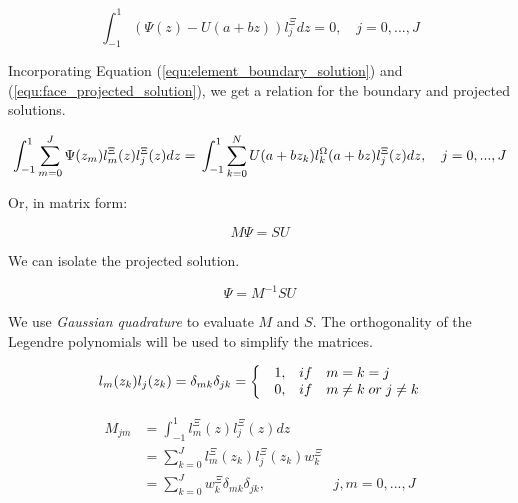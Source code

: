 \begin{equation} \label{equ:zero_error}
	\int_{-1}^{1} \left( \Psi (z) - U(a + bz) \right) l_j^\Xi dz = 0, \quad j = 0, ...,J
\end{equation}

Incorporating Equation (\ref{equ:element_boundary_solution}) and (\ref{equ:face_projected_solution}),
we get a relation for the boundary and projected solutions.

\begin{equation} \label{equ:boundarry_and_projected}
	\int_{-1}^{1} \sum_{m = 0}^{J} \Psi (z_m) l_m^\Xi (z) l_j ^ \Xi(z) dz = \\
	\int_{-1}^{1} \sum_{k = 0}^{N} U(a + b z_k) l_k^\Omega (a + b z) l_j ^ \Xi (z) dz, \\ \quad
	j = 0, ..., J
\end{equation}

Or, in matrix form:

\begin{equation}
	M \Psi = S U
\end{equation}

We can isolate the projected solution.

\begin{equation}
	\Psi = M^{-1} S U
\end{equation}

We use \textit{Gaussian quadrature} to evaluate $M$ and $S$. The orthogonality of the Legendre polynomials
will be used to simplify the matrices.

\begin{equation} \label{equ:orthogonality_M}
	l_m (z_k) l_j (z_k) = \\
	\delta _{mk} \delta _{j k} = \left\{ \begin{matrix*}[l]
	& 1, & if & m = k = j \\ 
	& 0, & if & m \neq k \; or \; j \neq k
	\end{matrix*}\right.
\end{equation}

\begin{equation} \label{equ:matrix_M}
	\begin{aligned}
		M_{jm} &= \int_{-1}^{1} l_m ^ \Xi (z) l_j ^ \Xi (z) dz \\
		&= \sum_{k = 0}^{J} l_m ^ \Xi (z_k) l_j ^ \Xi (z_k)w_k ^ \Xi \\
		&= \sum_{k = 0}^{J} w_k ^ \Xi \delta_{mk}\delta_{jk}, & j, m = 0, ..., J
	\end{aligned}
\end{equation}

